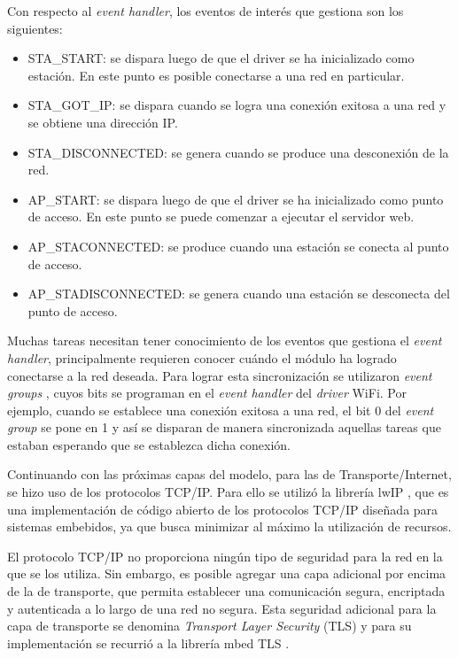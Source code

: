 Con respecto al \emph{event handler}, los eventos de interés que gestiona son los siguientes:

\begin{itemize}
	\item STA\_START: se dispara luego de que el driver se ha inicializado como estación. En este punto es posible conectarse a una red en particular.
	\item STA\_GOT\_IP: se dispara cuando se logra una conexión exitosa a una red y se obtiene una dirección IP.
	\item STA\_DISCONNECTED: se genera cuando se produce una desconexión de la red.
	\item AP\_START: se dispara luego de que el driver se ha inicializado como punto de acceso. En este punto se puede comenzar a ejecutar el servidor web.
	\item AP\_STACONNECTED: se produce cuando una estación se conecta al punto de acceso.
	\item AP\_STADISCONNECTED: se genera cuando una estación se desconecta del punto de acceso.
\end{itemize}

Muchas tareas necesitan tener conocimiento de los eventos que gestiona el \emph{event handler}, principalmente requieren conocer cuándo el módulo ha logrado conectarse a la red deseada. Para lograr esta sincronización se utilizaron \emph{event groups} \citep{event_groups}, cuyos bits se programan en el \emph{event handler} del \emph{driver} WiFi. Por ejemplo, cuando se establece una conexión exitosa a una red, el bit 0 del \emph{event group} se pone en 1 y así se disparan de manera sincronizada aquellas tareas que estaban esperando que se establezca dicha conexión.

Continuando con las próximas capas del modelo, para las de Transporte/Internet, se hizo uso de los protocolos TCP/IP. Para ello se utilizó la librería lwIP \citep{lwip}, que es una implementación de código abierto de los protocolos TCP/IP diseñada para sistemas embebidos, ya que busca minimizar al máximo la utilización de recursos.

El protocolo TCP/IP no proporciona ningún tipo de seguridad para la red en la que se los utiliza. Sin embargo, es posible agregar una capa adicional por encima de la de transporte, que permita establecer una comunicación segura, encriptada y autenticada a lo largo de una red no segura. Esta seguridad adicional para la capa de transporte se denomina \emph{Transport Layer Security} (TLS) \citep{tls} y para su implementación se recurrió a la librería mbed TLS \citep{mbed_tls}.

